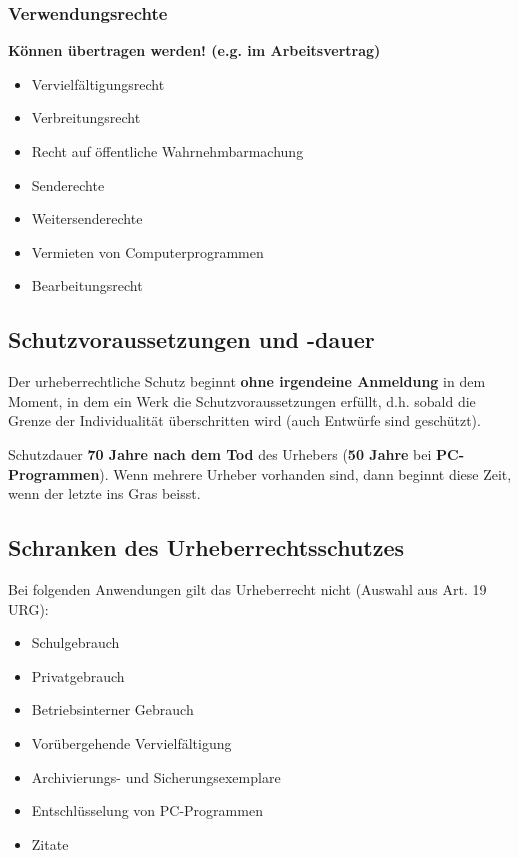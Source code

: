\subsubsection{Verwendungsrechte}
\textbf{Können übertragen werden! (e.g. im Arbeitsvertrag)}

\begin{itemize}
	\tightlist
	\item Vervielfältigungsrecht
	\item Verbreitungsrecht
	\item Recht auf öffentliche	Wahrnehmbarmachung
	\item Senderechte
	\item Weitersenderechte
	\item Vermieten von Computerprogrammen
	\item Bearbeitungsrecht
\end{itemize}

\subsection{Schutzvoraussetzungen und -dauer}

Der urheberrechtliche Schutz beginnt \textbf{ohne irgendeine Anmeldung}
in dem Moment, in dem ein Werk die Schutzvoraussetzungen erfüllt, d.h.
sobald die Grenze der Individualität überschritten wird (auch Entwürfe
sind geschützt).

Schutzdauer \textbf{70 Jahre nach dem Tod} des Urhebers (\textbf{50
Jahre} bei \textbf{PC-Programmen}). Wenn mehrere Urheber vorhanden sind,
dann beginnt diese Zeit, wenn der letzte ins Gras beisst.

\subsection{Schranken des Urheberrechtsschutzes}
\label{sec:Urheberrecht-Schranken}

Bei folgenden Anwendungen gilt das Urheberrecht nicht (Auswahl aus Art. 19 URG):

\begin{itemize}
	\tightlist
	\item Schulgebrauch
	\item Privatgebrauch
	\item Betriebsinterner Gebrauch
	\item Vorübergehende Vervielfältigung
	\item Archivierungs- und Sicherungsexemplare
	\item Entschlüsselung von PC-Programmen
	\item Zitate
\end{itemize}

